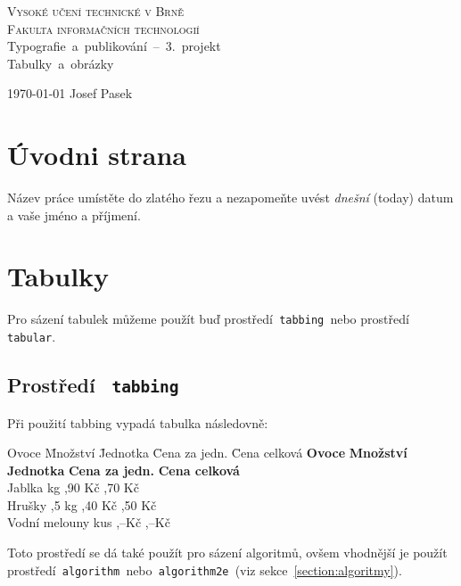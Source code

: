 \documentclass[a4paper, 11pt]{article}
\begin{document}
\makeatletter
\begin{titlepage}
	\begin{center}
		{\Huge \textsc{Vysoké učení technické v Brně}} \\[0.5em]
		{\huge \textsc{Fakulta informačních technologií}} \\[0.6em]
		\quad\hbox{\LARGE{Typografie a publikování -- 3. projekt}} \\[0.6em]
		\quad\hbox{\Huge{Tabulky a obrázky}}
	\end{center}
	\begin{flushright}
		{\Large \today} \hfill {\Large Josef Pasek}
	\end{flushright}
\end{titlepage}
\makeatother
\section{Úvodni strana}

Název práce umístěte do zlatého řezu a nezapomeňte uvést \textit{dnešní} (today) datum a vaše jméno a příjmení.

\section{Tabulky}

Pro sázení tabulek můžeme použít buď prostředí\texttt{ tabbing }nebo prostředí\texttt{ tabular}.
\subsection{Prostředí \texttt{ tabbing}}

Při použití tabbing vypadá tabulka následovně:

\begin{tabbing}
	Ovoce \hspace{1.5cm} \= Množství \hspace{0.3cm} \= Jednotka \hspace{0.3cm} \= Cena za jedn. \hspace{0.3cm} \= Cena celková \kill
	\textbf{Ovoce} \> \textbf{Množství} \> \textbf{Jednotka} \> \textbf{Cena za jedn.} \> \textbf{Cena celková} \\
	Jablka  \> kg ,90 Kč ,70 Kč \\
	Hrušky ,5 \> kg ,40 Kč ,50 Kč \\
	Vodní melouny  \> kus ,--Kč ,--Kč \\
\end{tabbing}
Toto prostředí se dá také použít pro sázení algoritmů, ovšem vhodnější je použít
prostředí\texttt{ algorithm }nebo\texttt{ algorithm2e }(viz sekce~\ref{section:algoritmy}).
\end{document}
